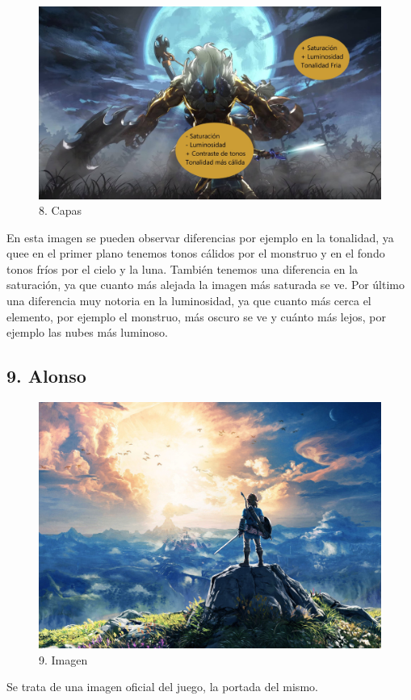 \documentclass[12pt]{article}
\begin{document}
\begin{figure}[H]
      \centering
      \includegraphics[width=\textwidth]{images/Raúl/Sección 8/Imagen 8 capas.jpg}
      \caption{\small 8. Capas}
    \end{figure}

En esta imagen se pueden observar diferencias por ejemplo en la tonalidad, ya quee en el primer plano tenemos tonos cálidos por el monstruo y en el fondo tonos fríos por el cielo y la luna. También tenemos una diferencia en la saturación, ya que cuanto más alejada la imagen más saturada se ve. Por último una diferencia muy notoria en la luminosidad, ya que cuanto más cerca el elemento, por ejemplo el monstruo, más oscuro se ve y cuánto más lejos, por ejemplo las nubes más luminoso.

        \newpage


    \subsection{9. Alonso}
    \begin{figure}[H]
      \centering
      \includegraphics[width=\textwidth]{images/Concepts/9_concept_art}
      \caption{\small 9. Imagen}
    \end{figure}
    Se trata de una imagen oficial del juego, la portada del mismo.
\end{document}
